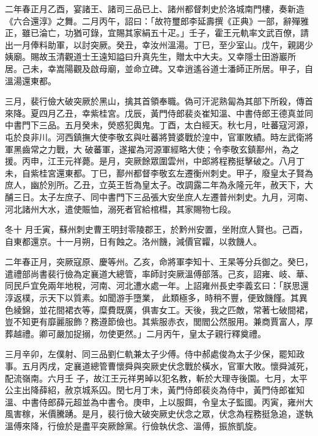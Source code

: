 \begin{pinyinscope}
 二年春正月乙酉，宴諸王、諸司三品已上、諸州都督刺史於洛城南門樓，奏新造《六合還淳》之舞。二月丙午，詔曰：「故符璽郎李延壽撰《正典》一部，辭殫雅正，雖已淪亡，功猶可錄，宜賜其家絹五十疋。」壬子，霍王元軌率文武百僚，請出一月俸料助軍，以討突厥。癸丑，幸汝州溫湯。丁巳，至少室山。戊午，親謁少姨廟。賜故玉清觀道士王遠知謚曰升真先生，贈太中大夫。又幸隱士田游巖所
 居。己未，幸嵩陽觀及啟母廟，並命立碑。又幸逍遙谷道士潘師正所居。甲子，自溫湯還東都。



 三月，裴行儉大破突厥於黑山，擒其首領奉職。偽可汗泥熟匐為其部下所殺，傳首來降。夏四月乙丑，幸紫桂宮。戊辰，黃門侍郎裴炎崔知溫、中書侍郎王德真並同中書門下三品。五月癸未，熒惑犯輿鬼。丁酉，太白經天。秋七月，吐蕃寇河源，屯於良非川。河西鎮撫大使李敬玄與吐蕃將贊婆戰於湟中，官軍敗績。時左武衛將軍黑齒常之力戰，大
 破蕃軍，遂擢為河源軍經略大使；令李敬玄鎮鄯州，為之援。丙申，江王元祥薨。是月，突厥餘眾圍雲州，中郎將程務挺擊破之。八月丁未，自紫桂宮還東都。丁巳，鄯州都督李敬玄左遷衡州刺史。甲子，廢皇太子賢為庶人，幽於別所。乙丑，立英王哲為皇太子。改調露二年為永隆元年，赦天下，大酺三日。太子左庶子、同中書門下三品張大安坐庶人左遷普州刺史。九月，河南、河北諸州大水，遣使賑恤，溺死者官給棺槥，其家賜物七段。



 冬十
 月壬寅，蘇州刺史曹王明封零陵郡王，於黔州安置，坐附庶人賢也。己酉，自東都還京。十一月朔，日有蝕之。洛州饑，減價官糶，以救饑人。



 二年春正月，突厥寇原、慶等州。乙亥，命將軍李知十、王杲等分兵御之。癸巳，遣禮部尚書裴行儉為定襄道大總管，率師討突厥溫傅部落。己亥，詔雍、岐、華、同民戶宜免兩年地稅，河南、河北遭水處一年。上詔雍州長史李義玄曰：「朕思還淳返樸，示天下以質素。如聞游手墮業，
 此類極多，時稍不豐，便致饑饉。其異色綾錦，並花間裙衣等，糜費既廣，俱害女工。天後，我之匹敵，常著七破間裙，豈不知更有靡麗服飾？務遵節儉也。其紫服赤衣，閭閻公然服用。兼商賈富人，厚葬越禮。卿可嚴加捉搦，勿使更然。」二月丙午，皇太子親行釋奠禮。



 三月辛卯，左僕射、同三品劉仁軌兼太子少傅。侍中郝處俊為太子少保，罷知政事。五月丙戌，定襄道總管曹懷舜與突厥史伏念戰於橫水，官軍大敗。懷舜減死，配流嶺南。六月壬
 子，故江王元祥男晫以犯名教，斬於大理寺後園。七月，太平公主出降薛紹，赦京城系囚。閏七月丁未，黃門侍郎裴炎為侍中，黃門侍郎崔知溫、中書侍郎薛元超並為中書令。庚申，上以服餌，令皇太子監國。丙寅，雍州大風害稼，米價騰踴。是月，裴行儉大破突厥史伏念之眾，伏念為程務挺急追，遂執溫傅來降，行儉於是盡平突厥餘黨。行儉執伏念、溫傅，振旅凱旋。




\end{pinyinscope}
